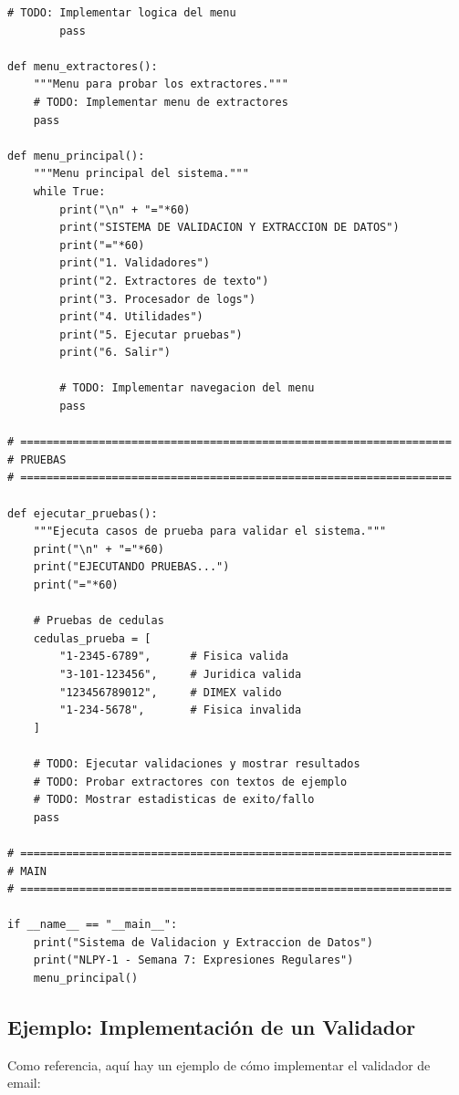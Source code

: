 \documentclass[11pt,letterpaper]{article}
\begin{document}
\begin{lstlisting}[caption={Plantilla del validador y extractor}]
        # TODO: Implementar logica del menu
        pass

def menu_extractores():
    """Menu para probar los extractores."""
    # TODO: Implementar menu de extractores
    pass

def menu_principal():
    """Menu principal del sistema."""
    while True:
        print("\n" + "="*60)
        print("SISTEMA DE VALIDACION Y EXTRACCION DE DATOS")
        print("="*60)
        print("1. Validadores")
        print("2. Extractores de texto")
        print("3. Procesador de logs")
        print("4. Utilidades")
        print("5. Ejecutar pruebas")
        print("6. Salir")
        
        # TODO: Implementar navegacion del menu
        pass

# ==================================================================
# PRUEBAS
# ==================================================================

def ejecutar_pruebas():
    """Ejecuta casos de prueba para validar el sistema."""
    print("\n" + "="*60)
    print("EJECUTANDO PRUEBAS...")
    print("="*60)
    
    # Pruebas de cedulas
    cedulas_prueba = [
        "1-2345-6789",      # Fisica valida
        "3-101-123456",     # Juridica valida
        "123456789012",     # DIMEX valido
        "1-234-5678",       # Fisica invalida
    ]
    
    # TODO: Ejecutar validaciones y mostrar resultados
    # TODO: Probar extractores con textos de ejemplo
    # TODO: Mostrar estadisticas de exito/fallo
    pass

# ==================================================================
# MAIN
# ==================================================================

if __name__ == "__main__":
    print("Sistema de Validacion y Extraccion de Datos")
    print("NLPY-1 - Semana 7: Expresiones Regulares")
    menu_principal()
\end{lstlisting}

\subsection{Ejemplo: Implementación de un Validador}

Como referencia, aquí hay un ejemplo de cómo implementar el validador de email:
\end{document}
